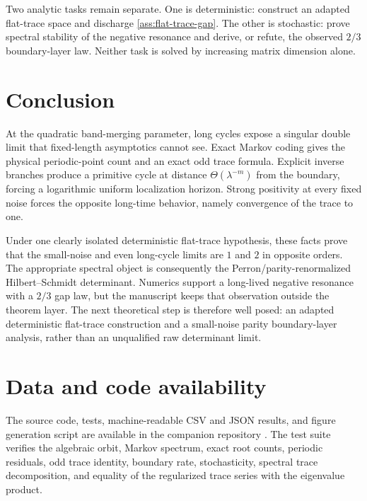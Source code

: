 \documentclass[11pt]{article}
\theoremstyle{definition}
\theoremstyle{remark}
\begin{document}
Two analytic tasks remain separate.  One is deterministic: construct an
adapted flat-trace space and discharge \cref{ass:flat-trace-gap}.  The other
is stochastic: prove spectral stability of the negative resonance and derive,
or refute, the observed $2/3$ boundary-layer law.  Neither task is solved by
increasing matrix dimension alone.

\section{Conclusion}

At the quadratic band-merging parameter, long cycles expose a singular double
limit that fixed-length asymptotics cannot see.  Exact Markov coding gives the
physical periodic-point count and an exact odd trace formula.  Explicit
inverse branches produce a primitive cycle at distance
$\Theta(\lambda^{-m})$ from the boundary, forcing a logarithmic uniform
localization horizon.  Strong positivity at every fixed noise forces the
opposite long-time behavior, namely convergence of the trace to one.

Under one clearly isolated deterministic flat-trace hypothesis, these facts
prove that the small-noise and even long-cycle limits are $1$ and $2$ in
opposite orders.  The appropriate spectral object is consequently the
Perron/parity-renormalized Hilbert--Schmidt determinant.  Numerics support a
long-lived negative resonance with a $2/3$ gap law, but the manuscript keeps
that observation outside the theorem layer.  The next theoretical step is
therefore well posed: an adapted deterministic flat-trace construction and a
small-noise parity boundary-layer analysis, rather than an unqualified raw
determinant limit.

\section*{Data and code availability}

The source code, tests, machine-readable CSV and JSON results, and figure
generation script are available in the companion repository
\citep{WangLongCycleCode2026}.  The test suite verifies the algebraic orbit,
Markov spectrum, exact root counts, periodic residuals, odd trace identity,
boundary rate, stochasticity, spectral trace decomposition, and equality of
the regularized trace series with the eigenvalue product.



\end{document}
